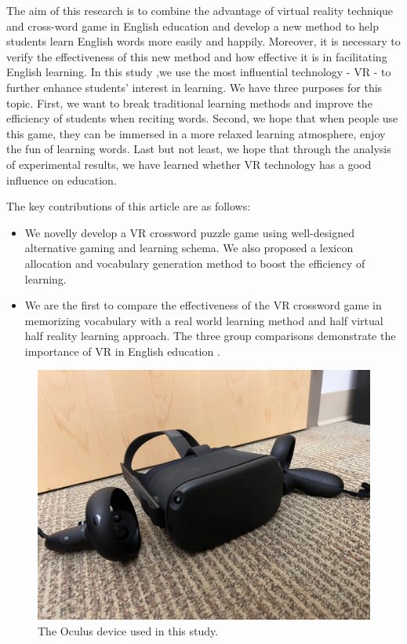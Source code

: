 \documentclass{vgtc}                          %
\begin{document}
The aim of this research is to combine the advantage of virtual reality technique and cross-word game in English education and develop a new method to help students learn English words more easily and happily. Moreover, it is necessary to verify the effectiveness of this new method and how effective it is in facilitating English learning. In this study ,we use the most influential technology - VR - to further enhance students' interest in learning. We have three purposes for this topic. First, we want to break traditional learning methods and improve the efficiency of students when reciting words. Second, we hope that when people use this game, they can be immersed in a more relaxed learning atmosphere, enjoy the fun of learning words. Last but not least, we hope that through the analysis of experimental results, we have learned whether VR technology has a good influence on education.

The key contributions of this article are as follows:
\begin{itemize}
\item We novelly develop a VR crossword puzzle game using well-designed alternative gaming and learning schema. We also proposed a lexicon allocation and vocabulary generation method to boost the efficiency of learning.
\item We are the first to compare the effectiveness of the VR crossword game in memorizing vocabulary with a real world learning method and half virtual half reality learning approach. The three group comparisons demonstrate the importance of VR in English education \cite{10.1145/257874.257886}. 
\end{itemize}

\begin{figure}[H]
 \centering 
 \includegraphics[width=\columnwidth]{pictures/OurOculus.jpg}
 \caption{The Oculus device used in this study.}
   \label{fig:oculus}
\end{figure}
\end{document}
